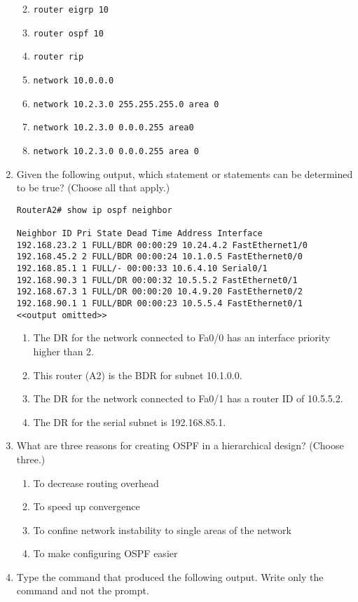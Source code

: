 \begin{enumerate}
  \begin{enumerate}
  \def\labelenumii{\Alph{enumii}.}
  \tightlist
  \item
    \texttt{router\ eigrp\ 10}
  \item
    \texttt{router\ ospf\ 10}
  \item
    \texttt{router\ rip}
  \item
    \texttt{network\ 10.0.0.0}
  \item
    \texttt{network\ 10.2.3.0\ 255.255.255.0\ area\ 0}
  \item
    \texttt{network\ 10.2.3.0\ 0.0.0.255\ area0}
  \item
    \texttt{network\ 10.2.3.0\ 0.0.0.255\ area\ 0}
  \end{enumerate}
\item
  Given the following output, which statement or statements can be
  determined to be true? (Choose all that apply.)

\begin{verbatim}
RouterA2# show ip ospf neighbor
 
Neighbor ID Pri State Dead Time Address Interface
192.168.23.2 1 FULL/BDR 00:00:29 10.24.4.2 FastEthernet1/0
192.168.45.2 2 FULL/BDR 00:00:24 10.1.0.5 FastEthernet0/0
192.168.85.1 1 FULL/- 00:00:33 10.6.4.10 Serial0/1
192.168.90.3 1 FULL/DR 00:00:32 10.5.5.2 FastEthernet0/1
192.168.67.3 1 FULL/DR 00:00:20 10.4.9.20 FastEthernet0/2
192.168.90.1 1 FULL/BDR 00:00:23 10.5.5.4 FastEthernet0/1
<<output omitted>>
\end{verbatim}

  \begin{enumerate}
  \def\labelenumii{\Alph{enumii}.}
  \tightlist
  \item
    The DR for the network connected to Fa0/0 has an interface priority
    higher than 2.
  \item
    This router (A2) is the BDR for subnet 10.1.0.0.
  \item
    The DR for the network connected to Fa0/1 has a router ID of
    10.5.5.2.
  \item
    The DR for the serial subnet is 192.168.85.1.
  \end{enumerate}
\item
  What are three reasons for creating OSPF in a hierarchical design?
  (Choose three.)

  \begin{enumerate}
  \def\labelenumii{\Alph{enumii}.}
  \tightlist
  \item
    To decrease routing overhead
  \item
    To speed up convergence
  \item
    To confine network instability to single areas of the network
  \item
    To make configuring OSPF easier
  \end{enumerate}
\item
  Type the command that produced the following output. Write only the
  command and not the prompt.


\end{enumerate}
